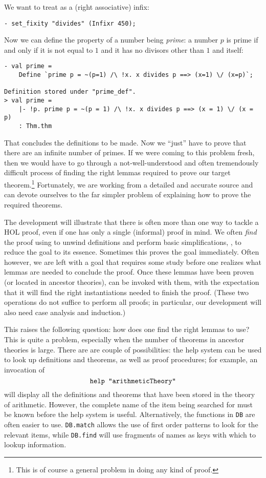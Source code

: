 We want to treat  as a (right associative) infix:
\begin{session}\begin{verbatim}
- set_fixity "divides" (Infixr 450);
\end{verbatim}\end{session}
Now we can define the property of a number being \emph{prime}: a number $p$ is
prime if and only if it is not equal to $1$ and it has no divisors other
than $1$ and itself:

\begin{session}\begin{verbatim}
- val prime =
    Define `prime p = ~(p=1) /\ !x. x divides p ==> (x=1) \/ (x=p)`;

Definition stored under "prime_def".
> val prime =
    |- !p. prime p = ~(p = 1) /\ !x. x divides p ==> (x = 1) \/ (x = p)
    : Thm.thm
\end{verbatim}\end{session}

That concludes the definitions to be made. Now we ``just'' have to prove
that there are an infinite number of primes. If we were coming to this
problem fresh, then we would have to go through a not-well-understood
and often tremendously difficult process of finding the right lemmas
required to prove our target theorem.\footnote{This is of course a
general problem in doing any kind of proof.} Fortunately, we are working
from a detailed and accurate source and can devote ourselves to the far
simpler problem of explaining how to prove the required theorems.

The development will illustrate that there is often more than one way to
tackle a HOL proof, even if one has only a single (informal) proof in
mind. We often \emph{find} the proof using  to unwind
definitions and perform basic simplifications, \ie, to reduce the goal
to its essence. Sometimes this proves the goal immediately. Often
however, we are left with a goal that requires some study before one
realizes what lemmas are needed to conclude the proof. Once these lemmas
have been proven (or located in ancestor theories),  can
be invoked with them, with the expectation that it will find the right
instantiations needed to finish the proof. (These two operations do not
suffice to perform all proofs; in particular, our development will also need
case analysis and induction.)

This raises the following question: how does one find the right lemmas
to use? This is quite a problem, especially when the number of
theorems in ancestor theories is large. There are are couple of
possibilities: the help system can be used to look up definitions and
theorems, as well as proof procedures; for example, an invocation of
\[
\mbox{\texttt{help "arithmeticTheory"}}
\]
will display all the definitions and theorems that have been stored in
the theory of arithmetic. However, the complete name of the item being
searched for must be known before the help system is useful.
Alternatively, the functions in \verb+DB+ are often easier to use.
\verb+DB.match+ allows the use of first order patterns to look for the
relevant items, while \verb+DB.find+ will use fragments of names as
keys with which to lookup information.


